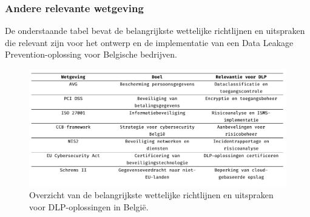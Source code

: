 
\subsubsection{Andere relevante wetgeving}%

De onderstaande tabel bevat de belangrijkste wettelijke richtlijnen en uitspraken die relevant zijn voor het ontwerp en de implementatie van een Data Leakage Prevention-oplossing voor Belgische bedrijven.

\begin{figure}
    \centering
    \includegraphics[scale=0.50]
    {img/overzicht.png}
    \caption{\label{fig:overzicht}Overzicht van de belangrijkste wettelijke richtlijnen en uitspraken voor DLP-oplossingen in België.}
  \end{figure}




